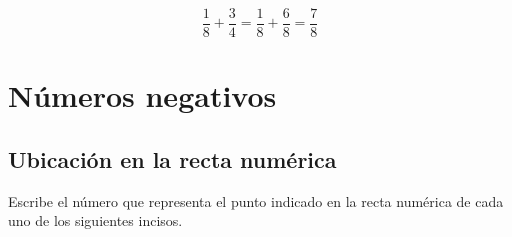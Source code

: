 \documentclass[12pt,addpoints,answers]{evalua}
\begin{document}
\begin{questions}
\begin{parts}
            \begin{solutionbox}{1.8cm}
                  \[\dfrac{1}{8}+\dfrac{3}{4}=\dfrac{1}{8}+\dfrac{6}{8}=\dfrac{7}{8}\]
            \end{solutionbox}
      \end{parts}


	\section{Números negativos}

      
	\subsection{Ubicación en la recta numérica}

      \question[4] Escribe el número que representa el punto indicado en la recta numérica de cada uno de los siguientes incisos.

      \begin{multicols}{2}
\end{multicols}
\end{questions}
\end{document}
